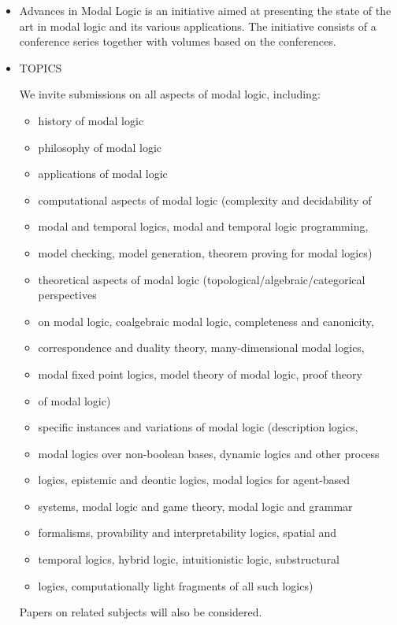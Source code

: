 \documentclass[prodmode,acmtecs]{acmsmall} %
\begin{document}
\begin{itemize}\item  Advances in Modal Logic is an initiative aimed at presenting the state of the art in modal logic and its various applications. The initiative consists of a conference series together with volumes based on the conferences.  
 
\item  TOPICS  
 
  We invite submissions on all aspects of modal logic, including: 
 
\begin{itemize}\item  history of modal logic 
\item  philosophy of modal logic 
\item  applications of modal logic 
\item  computational aspects of modal logic (complexity and decidability of 
\item  modal and temporal logics, modal and temporal logic programming, 
\item  model checking, model generation, theorem proving for modal logics) 
\item  theoretical aspects of modal logic (topological/algebraic/categorical perspectives 
\item  on modal logic, coalgebraic modal logic, completeness and canonicity, 
\item  correspondence and duality theory, many-dimensional modal logics, 
\item  modal fixed point logics, model theory of modal logic, proof theory 
\item  of modal logic) 
\item  specific instances and variations of modal logic (description logics, 
\item  modal logics over non-boolean bases, dynamic logics and other process 
\item  logics, epistemic and deontic logics, modal logics for agent-based 
\item  systems, modal logic and game theory, modal logic and grammar 
\item  formalisms, provability and interpretability logics, spatial and 
\item  temporal logics, hybrid logic, intuitionistic logic, substructural 
\item  logics, computationally light fragments of all such logics) 
\end{itemize} 
  Papers on related subjects will also be considered.  
 

\end{itemize}
\end{document}
